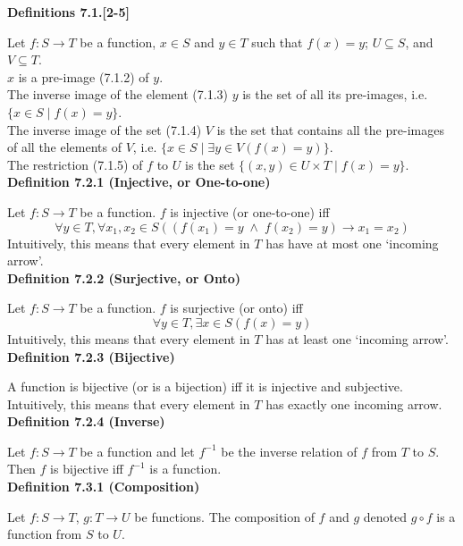 \documentclass[a4paper]{article}
\newcommand{\subheading}[1]{{\scriptsize\textbf{#1}}}
\begin{document}
\begin{multicols*}{4}
\subheading{Definitions 7.1.[2-5]}

Let $f : S \rightarrow T$ be a function, $x \in S$ and $y \in T$ such that
$f(x)=y$; $U \subseteq S$, and $V \subseteq T$.\\

$x$ is a pre-image (7.1.2) of $y$.\\

The inverse image of the element (7.1.3) $y$ is the set of all its pre-images,
i.e. $\{x \in S\;|\;f(x) = y\}$.\\

The inverse image of the set (7.1.4) $V$ is the set that contains all the
pre-images of all the elements of $V$, i.e.
$\{x \in S\;|\;\exists y \in V (f(x) = y)\}$.\\

The restriction (7.1.5) of $f$ to $U$ is the set
$\{(x, y) \in U \times T\;|\;f(x)=y\}$.\\

\subheading{Definition 7.2.1 (Injective, or One-to-one)}

Let $f : S \rightarrow T$ be a function. $f$ is injective (or one-to-one) iff
$$\forall y \in T, \forall x_1, x_2 \in S (
  (f(x_1) = y\;\land\;f(x_2) = y) \rightarrow x_1 = x_2)$$
Intuitively, this means that every element in $T$ has have at most one `incoming
arrow'.\\

\subheading{Definition 7.2.2 (Surjective, or Onto)}

Let $f : S \rightarrow T$ be a function. $f$ is surjective (or onto) iff
$$\forall y \in T, \exists x \in S (f(x) = y)$$
Intuitively, this means that every element in $T$ has at least one `incoming
arrow'.\\

\subheading{Definition 7.2.3 (Bijective)}

A function is bijective (or is a bijection) iff it is injective and
subjective. Intuitively, this means that every element in $T$ has exactly one
incoming arrow.\\

\subheading{Definition 7.2.4 (Inverse)}

Let $f : S \rightarrow T$ be a function and let $f^{-1}$ be the inverse relation
of $f$ from $T$ to $S$. Then $f$ is bijective iff $f^{-1}$ is a function.\\

\subheading{Definition 7.3.1 (Composition)}

Let $f : S \rightarrow T$, $g: T \rightarrow U$ be functions. The composition of
$f$ and $g$ denoted $g \circ f$ is a function from $S$ to $U$.\\


\end{multicols*}
\end{document}
